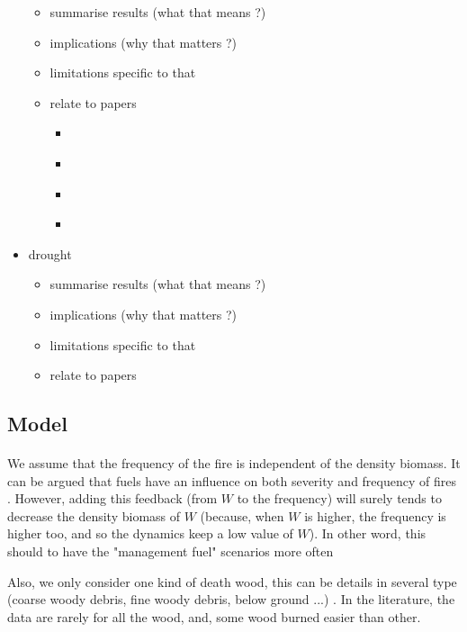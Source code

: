 \documentclass{article}
\begin{document}
\begin{itemize}
    \begin{itemize}
        \item summarise results (what that means ?)
        \item implications (why that matters ?)
        \item limitations specific to that
        \item relate to papers
        \begin{itemize}
            \item \cite{schoennagel_interaction_2004}
            \item \cite{agee_basic_2005}
            \item \cite{stephens_effects_2012}
            \item \cite{fernandes}
        \end{itemize}
    \end{itemize}
    \item drought
    \begin{itemize}
        \item summarise results (what that means ?)
        \item implications (why that matters ?)
        \item limitations specific to that
        \item relate to papers
    \end{itemize}
\end{itemize}






\subsection{Model}


\paragraph{}
We assume that the frequency of the fire is independent of the density biomass. It can be argued that fuels have an influence on both severity and frequency  of fires \cite{schoennagel_interaction_2004}. However, adding this feedback (from $W$ to the frequency) will surely tends to decrease the density biomass of $W$ (because, when $W$ is higher, the frequency is higher too, and so the dynamics keep a low value of $W$). In other word, this should to have the "management fuel" scenarios more often

Also, we only consider one kind of death wood, this can be details in several type (coarse woody debris, fine woody debris, below ground ...) \cite{russell_quantifying_2015}. In the literature, the data are rarely for all the wood, and, some wood burned easier than other. 
\end{document}
